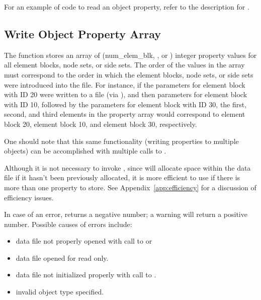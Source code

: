 For an example of code to read an object property, refer to the
description for .


\subsection{Write Object Property Array}

The function  stores an array of
({num_elem_blk}, , or ) integer
property values for all element blocks, node sets, or side sets. The
order of the values in the array must correspond to the order in which
the element blocks, node sets, or side sets were introduced into the
file. For instance, if the parameters for element block with ID 20
were written to a file (via ), and then
parameters for element block with ID 10, followed by the parameters
for element block with ID 30, the first, second, and third elements in
the property array would correspond to element block 20, element block
10, and element block 30, respectively.

One should note that this same functionality (writing properties to
multiple objects) can be accomplished with multiple calls to
.

Although it is not necessary to invoke ,
since  will allocate space within the data
file if it hasn't been previously allocated, it is more efficient to
use  if there is more than one property to
store. See Appendix~\ref{app:efficiency} for a discussion of
efficiency issues.

In case of an error,  returns a negative
number; a warning will return a positive number. Possible causes of
errors include:

\begin{itemize}

 \item data file not properly opened with call to 
 or 

 \item data file opened for read only.

 \item data file not initialized properly with call to
 .

 \item invalid object type specified.
\end{itemize}



